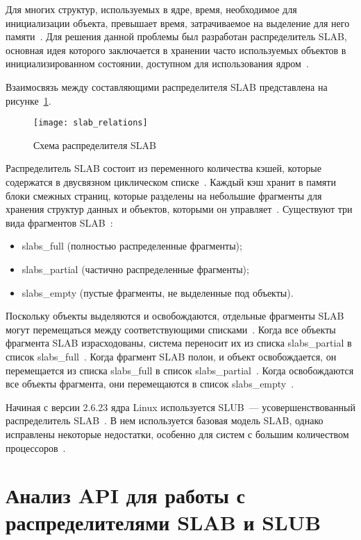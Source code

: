 Для многих структур, используемых в ядре, время, необходимое для инициализации объекта, превышает время, затрачиваемое на выделение для него памяти~\cite{slab_info}.
Для решения данной проблемы был разработан распределитель SLAB, основная идея которого заключается в хранении часто используемых объектов в инициализированном состоянии, доступном для использования ядром~\cite{slab_info}.

Взаимосвязь между составляющими распределителя SLAB представлена на рисунке~\ref{slab_relations}.
\begin{figure}[H]
	\centering
	\texttt{[image: slab\_relations]}
	\caption{Схема распределителя SLAB}
	\label{slab_relations}
\end{figure}

Распределитель SLAB состоит из переменного количества кэшей, которые содержатся в двусвязном циклическом списке~\cite{slab_info}.
Каждый кэш хранит в памяти блоки смежных страниц, которые разделены на небольшие фрагменты для хранения структур данных и объектов, которыми он управляет~\cite{slab_info}.
Существуют три вида фрагментов SLAB~\cite{slab_info}:
\begin{itemize}
	\item slabs\_full (полностью распределенные фрагменты);
	\item slabs\_partial (частично распределенные фрагменты);
	\item slabs\_empty (пустые фрагменты, не выделенные под объекты).
\end{itemize}

Поскольку объекты выделяются и освобождаются, отдельные фрагменты SLAB могут перемещаться между соответствующими списками~\cite{slab_info}.
Когда все объекты фрагмента SLAB израсходованы, система переносит их из списка slabs\_partial в список slabs\_full~\cite{slab_info}.
Когда фрагмент SLAB полон, и объект освобождается, он перемещается из списка slabs\_full в список slabs\_partial~\cite{slab_info}.
Когда освобождаются все объекты фрагмента, они перемещаются в список slabs\_empty~\cite{slab_info}.

Начиная с версии 2.6.23 ядра Linux используется SLUB~--- усовершенствованный распределитель SLAB~\cite{slub_info}.
В нем используется базовая модель SLAB, однако исправлены некоторые недостатки, особенно для систем с большим количеством процессоров~\cite{slub_info}.

\section{Анализ API для работы с распределителями SLAB и SLUB}


